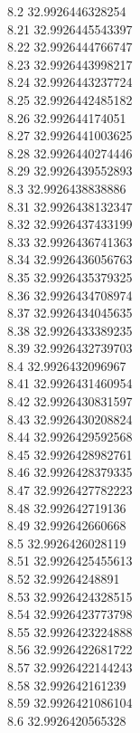 {8.2	32.9926446328254\\
8.21	32.9926445543397\\
8.22	32.9926444766747\\
8.23	32.9926443998217\\
8.24	32.9926443237724\\
8.25	32.9926442485182\\
8.26	32.992644174051\\
8.27	32.9926441003625\\
8.28	32.9926440274446\\
8.29	32.9926439552893\\
8.3	32.9926438838886\\
8.31	32.9926438132347\\
8.32	32.9926437433199\\
8.33	32.9926436741363\\
8.34	32.9926436056763\\
8.35	32.9926435379325\\
8.36	32.9926434708974\\
8.37	32.9926434045635\\
8.38	32.9926433389235\\
8.39	32.9926432739703\\
8.4	32.9926432096967\\
8.41	32.9926431460954\\
8.42	32.9926430831597\\
8.43	32.9926430208824\\
8.44	32.9926429592568\\
8.45	32.9926428982761\\
8.46	32.9926428379335\\
8.47	32.9926427782223\\
8.48	32.992642719136\\
8.49	32.992642660668\\
8.5	32.9926426028119\\
8.51	32.9926425455613\\
8.52	32.99264248891\\
8.53	32.9926424328515\\
8.54	32.9926423773798\\
8.55	32.9926423224888\\
8.56	32.9926422681722\\
8.57	32.9926422144243\\
8.58	32.992642161239\\
8.59	32.9926421086104\\
8.6	32.9926420565328\\
}
